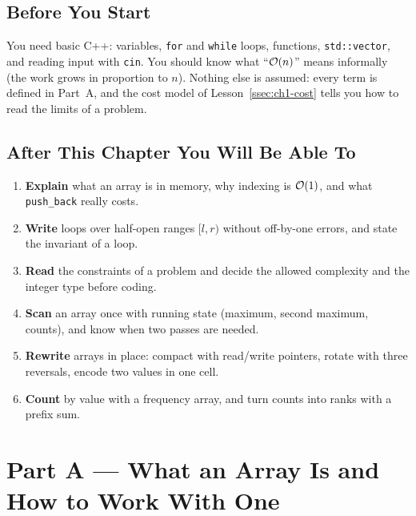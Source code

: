 \subsection*{Before You Start}

You need basic C++: variables, \texttt{for} and \texttt{while} loops, functions, \texttt{std::vector}, and reading input with \texttt{cin}. You should know what ``$\mathcal{O}(n)$'' means informally (the work grows in proportion to $n$). Nothing else is assumed: every term is defined in Part~A, and the cost model of Lesson~\ref{ssec:ch1-cost} tells you how to read the limits of a problem.

\subsection*{After This Chapter You Will Be Able To}
\begin{enumerate}[leftmargin=*]
    \item \textbf{Explain} what an array is in memory, why indexing is $\mathcal{O}(1)$, and what \texttt{push\_back} really costs.
    \item \textbf{Write} loops over half-open ranges $[l, r)$ without off-by-one errors, and state the invariant of a loop.
    \item \textbf{Read} the constraints of a problem and decide the allowed complexity and the integer type before coding.
    \item \textbf{Scan} an array once with running state (maximum, second maximum, counts), and know when two passes are needed.
    \item \textbf{Rewrite} arrays in place: compact with read/write pointers, rotate with three reversals, encode two values in one cell.
    \item \textbf{Count} by value with a frequency array, and turn counts into ranks with a prefix sum.
\end{enumerate}

\chaptercontents

\section{Part A --- What an Array Is and How to Work With One}
\label{sec:ch1-lessons}






